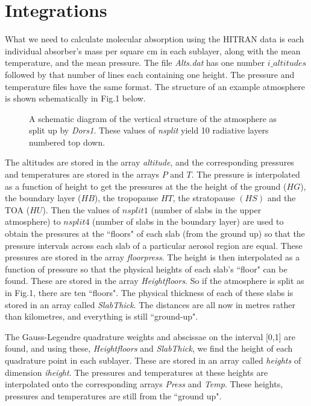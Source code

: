 \documentclass[12pt]{article}
\begin{document}
\section{Integrations}

What we need to calculate molecular absorption using the HITRAN data
is each individual absorber's mass per square cm
in each sublayer, along with the mean temperature, and the mean pressure. The file {\it Alts.dat}
has one number $i\_altitudes$ followed by that number of lines each containing one height.
The pressure and temperature files have the same format. The structure of an example
atmosphere is shown schematically in Fig.1 below.
\vspace*{10cm}
\begin{figure}[htb]
\caption{A schematic diagram of the vertical structure of the atmosphere
as split up by {\it Dors1}. These values of {\it nsplit}  yield 10 radiative
layers  numbered top down.}
\end{figure}

The altitudes are stored in the array {\it altitude}, and the corresponding
pressures and temperatures are stored in the arrays $P$ and $T$.
The pressure is interpolated as a function of height to get the pressures
at the the height of the ground ($HG$), the boundary layer ($HB$), the 
tropopause $HT$, the stratopause $(HS)$ and the TOA ($HU$). Then the values
of $nsplit1$ (number of slabs in the upper atmosphere) to $nsplit4$ (number of
slabs in the boundary layer) are used to obtain the pressures at the ``floors"
of each slab (from the ground up) so that the pressure intervals across each
 slab of a particular aerosol region are equal. These pressures are stored in the
array {\it floorpress}. The height is then interpolated as a function of pressure
so that the physical heights of each slab's ``floor" can be found. These
are stored in the array {\it Heightfloors}. So if the atmosphere is split as in
Fig.1, there are ten ``floors". The physical thickness of each of these slabs
is stored in an array called {\it SlabThick}. The distances are all now in metres
rather than kilometres, and everything is still ``ground-up".

The Gauss-Legendre quadrature weights and abscissae on the interval [0,1] are found, and using
these, {\it Heightfloors} and {\it SlabThick}, we find the height of each quadrature point 
in each sublayer. These are stored in an array called {\it heights} of dimension {\it iheight}.
The pressures and temperatures at these heights are interpolated onto the corresponding
arrays {\it Press} and {\it Temp}. These heights, pressures and temperatures are still
from the ``ground up".
\end{document}
